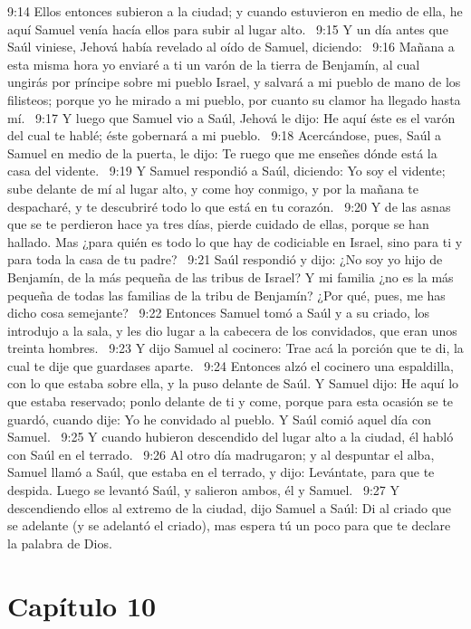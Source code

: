 9:14 Ellos entonces subieron a la ciudad; y cuando estuvieron en medio de ella, he aquí Samuel venía hacía ellos para subir al lugar alto.  
9:15 Y un día antes que Saúl viniese, Jehová había revelado al oído de Samuel, diciendo:  
9:16 Mañana a esta misma hora yo enviaré a ti un varón de la tierra de Benjamín, al cual ungirás por príncipe sobre mi pueblo Israel, y salvará a mi pueblo de mano de los filisteos; porque yo he mirado a mi pueblo, por cuanto su clamor ha llegado hasta mí.  
9:17 Y luego que Samuel vio a Saúl, Jehová le dijo: He aquí éste es el varón del cual te hablé; éste gobernará a mi pueblo.  
9:18 Acercándose, pues, Saúl a Samuel en medio de la puerta, le dijo: Te ruego que me enseñes dónde está la casa del vidente.  
9:19 Y Samuel respondió a Saúl, diciendo: Yo soy el vidente; sube delante de mí al lugar alto, y come hoy conmigo, y por la mañana te despacharé, y te descubriré todo lo que está en tu corazón.  
9:20 Y de las asnas que se te perdieron hace ya tres días, pierde cuidado de ellas, porque se han hallado. Mas ¿para quién es todo lo que hay de codiciable en Israel, sino para ti y para toda la casa de tu padre?  
9:21 Saúl respondió y dijo: ¿No soy yo hijo de Benjamín, de la más pequeña de las tribus de Israel? Y mi familia ¿no es la más pequeña de todas las familias de la tribu de Benjamín? ¿Por qué, pues, me has dicho cosa semejante?  
9:22 Entonces Samuel tomó a Saúl y a su criado, los introdujo a la sala, y les dio lugar a la cabecera de los convidados, que eran unos treinta hombres.  
9:23 Y dijo Samuel al cocinero: Trae acá la porción que te di, la cual te dije que guardases aparte.  
9:24 Entonces alzó el cocinero una espaldilla, con lo que estaba sobre ella, y la puso delante de Saúl. Y Samuel dijo: He aquí lo que estaba reservado; ponlo delante de ti y come, porque para esta ocasión se te guardó, cuando dije: Yo he convidado al pueblo. Y Saúl comió aquel día con Samuel.  
9:25 Y cuando hubieron descendido del lugar alto a la ciudad, él habló con Saúl en el terrado.  
9:26 Al otro día madrugaron; y al despuntar el alba, Samuel llamó a Saúl, que estaba en el terrado, y dijo: Levántate, para que te despida. Luego se levantó Saúl, y salieron ambos, él y Samuel.  
9:27 Y descendiendo ellos al extremo de la ciudad, dijo Samuel a Saúl: Di al criado que se adelante (y se adelantó el criado), mas espera tú un poco para que te declare la palabra de Dios.  
\section*{Capítulo 10 }

